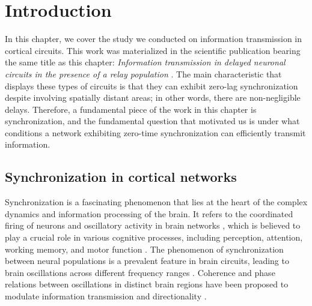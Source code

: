 \documentclass[../main.tex]{subfiles}
\begin{document}
\section{Introduction}
In this chapter, we cover the study we conducted on information transmission in cortical circuits.
This work was materialized in the scientific publication bearing the same title as this chapter: \textit{Information transmission in delayed neuronal circuits in the presence of a relay population} \citep{sanchez-claros_information_2021}.
The main characteristic that displays these types of circuits is that they can exhibit zero-lag synchronization despite involving spatially distant areas; in other words, there are non-negligible delays.
Therefore, a fundamental piece of the work in this chapter is synchronization, and the fundamental question that motivated us is under what conditions a network exhibiting zero-time synchronization can efficiently transmit information.

\subsection{Synchronization in cortical networks}
Synchronization is a fascinating phenomenon that lies at the heart of the complex dynamics and information processing of the brain. 
It refers to the coordinated firing of neurons and oscillatory activity in brain networks \citep{buzsaki_large-scale_2004}, which is believed to play a crucial role in various cognitive processes, including perception, attention, working memory, and motor function \citep{singer_binding_2007, coll_behavioral_2018,opitz_neural_2010,niebur_electrophysiological_2002,borisyuk_oscillatory_1999, doesburg_large-scale_2008,baddeley_working_1992,baddeley_working_2010,denker_phase_2007,baker_synchronization_2003, feige_dynamic_2000}.
The phenomenon of synchronization between neural populations is a prevalent feature in brain circuits, leading to brain oscillations across different frequency ranges \citep{pfurtscheller_brain_2000, basar_brain_2000, varela2001brainweb, basar_brain_2012, jensen_human_2019}.
Coherence and phase relations between oscillations in distinct brain regions have been proposed to modulate information transmission and directionality \citep{eckhorn_coherent_1988, pfurtscheller_brain_2000,gross_dynamic_2001,fries_mechanism_2005,maris_diverse_2016}.
\end{document}
